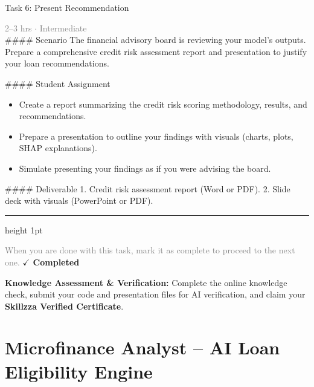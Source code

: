 \documentclass[10pt,a4paper]{article}
\begin{document}
\begin{taskbox}{Task 6: Present Recommendation}

    {\small \textcolor{gray}{2--3 hrs $\cdot$ Intermediate}}\\[12pt]

    \#\#\#\# Scenario  
The financial advisory board is reviewing your model’s outputs. Prepare a comprehensive credit risk assessment report and presentation to justify your loan recommendations.  

\#\#\#\# Student Assignment  
\begin{itemize}
    \item Create a report summarizing the credit risk scoring methodology, results, and recommendations.  
    \item Prepare a presentation to outline your findings with visuals (charts, plots, SHAP explanations).  
    \item Simulate presenting your findings as if you were advising the board.  
\end{itemize}

\#\#\#\# Deliverable  
1. Credit risk assessment report (Word or PDF).  
2. Slide deck with visuals (PowerPoint or PDF).\par

    \vspace{16pt}

    \textcolor{cardBorder}{\hrule height 1pt}\vspace{8pt}

    \small \textcolor{gray}{When you are done with this task, mark it as complete to proceed to the next one.} \hfill \textbf{\textcolor{brandDark}{$\checkmark$ Completed}}

\end{taskbox}

\begin{completionbox}
    \textbf{Knowledge Assessment \& Verification:} Complete the online knowledge check, submit your code and presentation files for AI verification, and claim your \textbf{Skillzza Verified Certificate}.
\end{completionbox}

\newpage




\section*{Microfinance Analyst – AI Loan Eligibility Engine}
\end{document}
